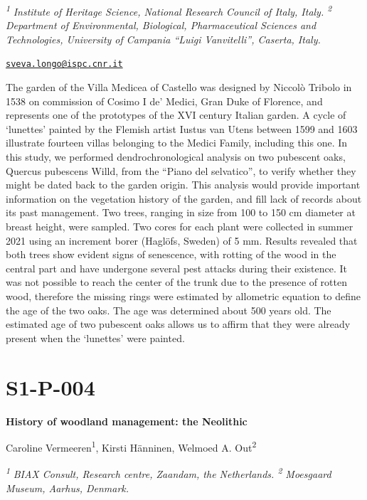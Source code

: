 \documentclass[
]{book}
\begin{document}
\textsuperscript{\emph{1}} \emph{Institute of Heritage Science, National Research Council of Italy, Italy. \textsuperscript{2} Department of Environmental, Biological, Pharmaceutical Sciences and Technologies, University of Campania ``Luigi Vanvitelli'', Caserta, Italy.}

\href{mailto:sveva.longo@ispc.cnr.it}{\nolinkurl{sveva.longo@ispc.cnr.it}}

The garden of the Villa Medicea of Castello was designed by Niccolò Tribolo in 1538 on commission of Cosimo I de' Medici, Gran Duke of Florence, and represents one of the prototypes of the XVI century Italian garden. A cycle of `lunettes' painted by the Flemish artist Iustus van Utens between 1599 and 1603 illustrate fourteen villas belonging to the Medici Family, including this one. In this study, we performed dendrochronological analysis on two pubescent oaks, Quercus pubescens Willd, from the ``Piano del selvatico'', to verify whether they might be dated back to the garden origin. This analysis would provide important information on the vegetation history of the garden, and fill lack of records about its past management. Two trees, ranging in size from 100 to 150 cm diameter at breast height, were sampled. Two cores for each plant were collected in summer 2021 using an increment borer (Haglöfs, Sweden) of 5 mm. Results revealed that both trees show evident signs of senescence, with rotting of the wood in the central part and have undergone several pest attacks during their existence. It was not possible to reach the center of the trunk due to the presence of rotten wood, therefore the missing rings were estimated by allometric equation to define the age of the two oaks. The age was determined about 500 years old. The estimated age of two pubescent oaks allows us to affirm that they were already present when the `lunettes' were painted.

\hypertarget{s1-p-004}{%
\section*{S1-P-004}\label{s1-p-004}}

\textbf{History of woodland management: the Neolithic}

Caroline Vermeeren\textsuperscript{1}, Kirsti Hänninen, Welmoed A. Out\textsuperscript{2}

\textsuperscript{\emph{1}} \emph{BIAX Consult, Research centre, Zaandam, the Netherlands. \textsuperscript{2} Moesgaard Museum, Aarhus, Denmark.}
\end{document}
